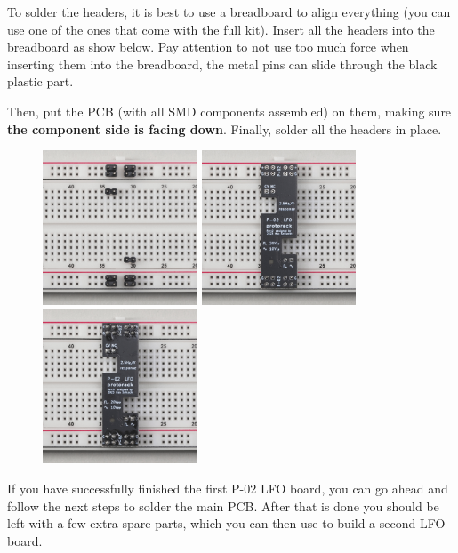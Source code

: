 \documentclass[12pt, a4paper]{article}
\begin{document}
To solder the headers, it is best to use a breadboard to align everything (you can use one of
the ones that come with the full kit). Insert all the headers into the breadboard as show
below. Pay attention to not use too much force when inserting them into the breadboard, the
metal pins can slide through the black plastic part.

Then, put the PCB (with all SMD components assembled) on them, making sure \textbf{the component
side is facing down}. Finally, solder all the headers in place.

\begin{figure}[H]
    \centering
    \includegraphics[width=46mm]{images/03_17_headers_breadboard.jpg}
    \hspace{2mm}
    \includegraphics[width=46mm]{images/03_18_headers_breadboard_pcb.jpg}
    \hspace{2mm}
    \includegraphics[width=46mm]{images/03_19_headers_soldered.jpg}
\end{figure}

If you have successfully finished the first P-02 LFO board, you can go ahead and follow the next
steps to solder the main PCB. After that is done you should be left with a few extra spare
parts, which you can then use to build a second LFO board.
\end{document}

